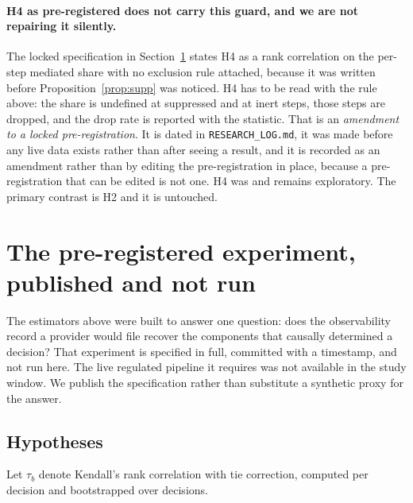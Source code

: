 \documentclass[11pt]{article}
\theoremstyle{remark}
\begin{document}
\paragraph{H4 as pre-registered does not carry this guard, and we are not
repairing it silently.} The locked specification in
Section~\ref{sec:prereg} states H4 as a rank correlation on the per-step
mediated share with no exclusion rule attached, because it was written before
Proposition~\ref{prop:supp} was noticed. H4 has to be read with the rule above:
the share is undefined at suppressed and at inert steps, those steps are
dropped, and the drop rate is reported with the statistic. That is an
\emph{amendment to a locked pre-registration}. It is dated in
\texttt{RESEARCH\_LOG.md}, it was made before any live data exists rather than
after seeing a result, and it is recorded as an amendment rather than by editing
the pre-registration in place, because a pre-registration that can be edited is
not one. H4 was and remains exploratory. The primary contrast is H2 and it is
untouched.

\section{The pre-registered experiment, published and not run}
\label{sec:prereg}

The estimators above were built to answer one question: does the observability
record a provider would file recover the components that causally determined a
decision? That experiment is specified in full, committed with a timestamp, and
not run here. The live regulated pipeline it requires was not available in the
study window. We publish the specification rather than substitute a synthetic
proxy for the answer.

\subsection{Hypotheses}

Let $\tau_b$ denote Kendall's rank correlation with tie correction, computed per
decision and bootstrapped over decisions.
\end{document}
